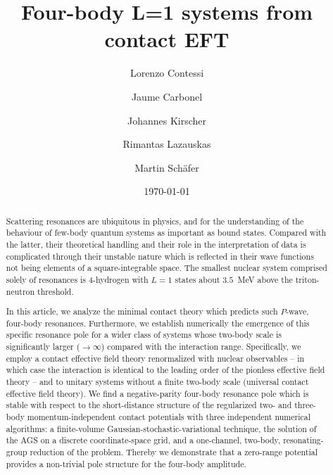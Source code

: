 \documentclass[aps,onecolumn,preprintnumbers,amsmath,amssymb,nofootinbib,superscriptaddress,notitlepage]{revtex4-1}
\begin{document}
\title{Four-body L=1 systems from contact EFT}

\author{Lorenzo Contessi}
\address{IRFU, CEA, Universit\'e Paris-Saclay, 91191 Gif-sur-Yvette, France}

\author{Jaume Carbonel}
\address{Universit\'e Paris-Saclay, CNRS/IN2P3, IJCLab, 91405 Orsay, France}

\author{Johannes Kirscher}
\address{Theoretical Physics Division, School of Physics and Astronomy,\\
  The University of Manchester, Manchester, M13 9PL, UK}
  
\author{Rimantas Lazauskas}
\address{IPHC, IN2P3-CNRS/Universit\'e de Strasbourg BP 28, F-67037 Strasbourg Cedex 2, France}

\author{Martin Sch{\"a}fer}
\address{Nuclear Physics Institute of the Czech Academy of Sciences, 25069 \v{R}e\v{z}, Czech Republic}

\date{\today}


\begin{abstract} 
Scattering resonances are ubiquitous in physics, and for the understanding of the behaviour of few-body quantum systems as important as bound states.
Compared with the latter, their theoretical handling and their role in
the interpretation of data is complicated through their unstable nature
which is reflected in their wave functions not being elements of a
square-integrable space.
The smallest nuclear system comprised solely of resonances
is 4-hydrogen with $L=1$ states about $3.5$~MeV above the triton-neutron
threshold.

In this article, we analyze the minimal contact theory which predicts
such $P$-wave, four-body resonances. Furthermore, we establish numerically
the emergence of this specific resonance pole for a wider class of systems
whose two-body scale is significantly larger ($\to\infty$) compared with the
interaction range.
Specifically, we employ a contact effective field theory renormalized
with nuclear observables -- in which case the interaction is identical
to the leading order of the pionless effective field theory --
and to unitary systems without a finite two-body scale (universal
contact effective field theory). We find a negative-parity four-body
resonance pole which is stable with respect to the short-distance structure
of the regularized two- and three-body momentum-independent contact
potentials with three independent numerical algorithms: a finite-volume
Gaussian-stochastic-variational technique, the solution of the AGS on a
discrete coordinate-space grid, and a one-channel, two-body,
resonating-group reduction of the problem.
Thereby we demonstrate that a zero-range potential
provides a non-trivial pole structure for the four-body amplitude.
\end{abstract}
\end{document}
